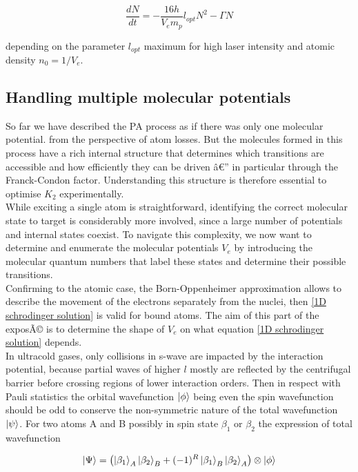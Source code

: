 \begin{equation}
    \frac{dN}{dt} =  -\frac{16h }{V_e m_p}l_{opt}N^2 - \Gamma N
\end{equation}

depending on the parameter $l_{opt}$ maximum for high laser intensity and atomic density $n_0= 1/V_e$.

\subsection{Handling multiple molecular potentials}
So far we have described the PA process as if there was only one molecular potential.
from the perspective of atom losses.
But the molecules formed in this process have a rich internal structure that 
determines which transitions are accessible and how efficiently they can be 
driven â€” in particular through the Franck-Condon factor. Understanding this 
structure is therefore essential to optimise $K_2$ experimentally.\\

While exciting a single atom is straightforward, identifying the correct 
molecular state to target is considerably more involved, since a large 
number of potentials and internal states coexist. To navigate this complexity, 
we now want to determine and enumerate the molecular potentials $V_e$ by introducing the molecular quantum 
numbers that label these states and determine their possible transitions.\\

Confirming to the atomic case, the Born-Oppenheimer approximation allows to describe the movement of the electrons
separately from the nuclei, then \ref{1D schrodinger solution} is valid for bound atoms. The aim of this part of the
exposÃ© is to determine the shape of $V_e$ on what equation \ref{1D schrodinger solution} depends.\\

In ultracold gases, only collisions in s-wave are impacted by the interaction potential, 
because partial waves of higher $l$ mostly are reflected by the centrifugal barrier before crossing regions of 
lower interaction orders. Then in respect with Pauli statistics the orbital wavefunction $\ket{\phi}$ being even 
the spin wavefunction should be odd to conserve the non-symmetric nature of the total wavefunction $\ket{\psi}$.
For two atoms A and B possibly in spin state $\beta_1$ or $\beta_2$ the expression of total wavefunction  

\begin{equation}
    \ket{\Psi} = \left(\ket{\beta_1}_A \ket{\beta_2}_B + (-1)^R \ket{\beta_1}_B \ket{\beta_2}_A\right)
     \otimes\ket{\phi}
     \label{wavefunction parity}
\end{equation}

